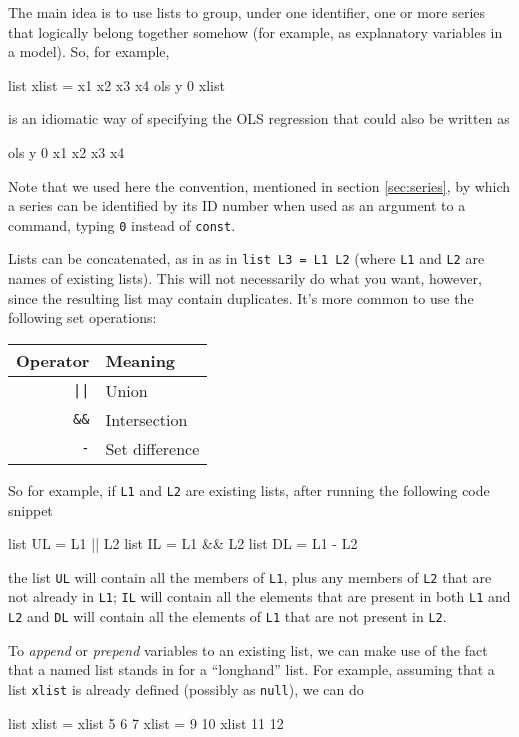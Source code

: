 The main idea is to use lists to group, under one identifier, one or
more series that logically belong together somehow (for example, as
explanatory variables in a model). So, for example,
\begin{code}
list xlist = x1 x2 x3 x4
ols y 0 xlist
\end{code}
is an idiomatic way of specifying the OLS regression that could also
be written as
\begin{code}
ols y 0 x1 x2 x3 x4
\end{code}
Note that we used here the convention, mentioned in section
\ref{sec:series}, by which a series can be identified by its ID number
when used as an argument to a command, typing \texttt{0} instead
of \texttt{const}.

Lists can be concatenated, as in as in \texttt{list L3 = L1 L2} (where
\texttt{L1} and \texttt{L2} are names of existing lists). This will
not necessarily do what you want, however, since the resulting list
may contain duplicates. It's more common to use the following set
operations:

\begin{center}
  \begin{tabular}{rl}
    \textbf{Operator} & \textbf{Meaning} \\
    \hline
    \verb,||, & Union \\
    \verb|&&| & Intersection \\
    \verb|-|  & Set difference \\
    \hline
  \end{tabular}
\end{center}

So for example, if \texttt{L1} and \texttt{L2} are existing lists,
after running the following code snippet
\begin{code}
  list UL = L1 || L2 
  list IL = L1 && L2
  list DL = L1 - L2
\end{code}
the list \texttt{UL} will contain all the members of \texttt{L1}, plus
any members of \texttt{L2} that are not already in \texttt{L1};
\texttt{IL} will contain all the elements that are present in both
\texttt{L1} and \texttt{L2} and \texttt{DL} will contain all the
elements of \texttt{L1} that are not present in \texttt{L2}. 

To \textit{append} or \textit{prepend} variables to an existing list,
we can make use of the fact that a named list stands in for a
``longhand'' list.  For example, assuming that a list \texttt{xlist}
is already defined (possibly as \texttt{null}), we can do
\begin{code}
list xlist = xlist 5 6 7
xlist = 9 10 xlist 11 12
\end{code}
 
